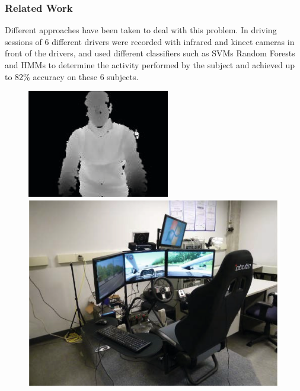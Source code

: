 \documentclass{beamer}
\begin{document}
	\begin{frame}
		\frametitle{Related Work}
		Different approaches have been taken to deal with this problem. In \cite{Ragab2014} driving sessions of 6 different drivers were recorded with infrared and kinect cameras in front of the drivers, and used different classifiers such as SVMs Random Forests and HMMs to determine the activity performed by the subject and achieved up to 82\% accuracy on these 6 subjects. 
		
		
		\begin{figure}
			\includegraphics{RanFor}
			\includegraphics[scale = .365]{RanForSim}
		\end{figure}
		\begin{figure}
			
			
			
		\end{figure}
	\end{frame}
	
\end{document}
